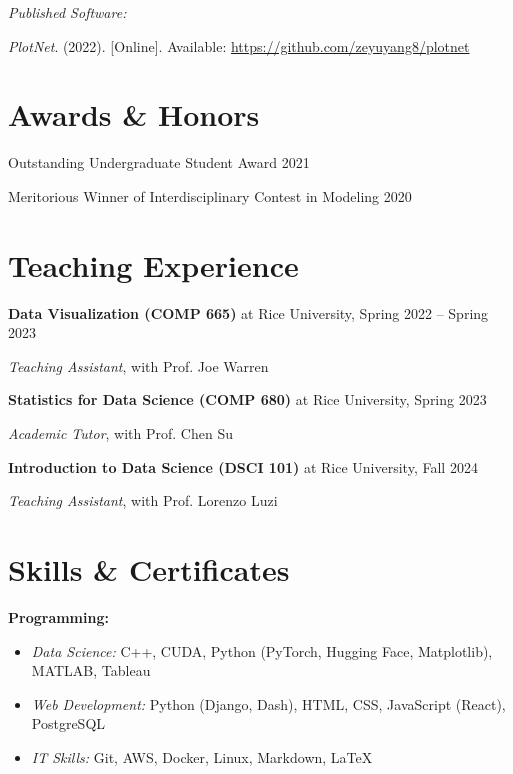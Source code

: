 \documentclass[11pt]{article}
\begin{document}
\vspace{\lineskip}

\textit{Published Software:}

\begin{enumerate}[resume, label={[\arabic*]}]
    \item \label{joe-plotnet} \textit{PlotNet}. (2022). [Online]. Available: \url{https://github.com/zeyuyang8/plotnet}
\end{enumerate}

\section*{Awards \& Honors}

Outstanding Undergraduate Student Award \hfill 2021

Meritorious Winner of Interdisciplinary Contest in Modeling \hfill 2020

\section*{Teaching Experience}

\textbf{Data Visualization (COMP 665)} at Rice University, \hfill Spring 2022 -- Spring 2023

\textit{Teaching Assistant}, with Prof. Joe Warren

\vspace{\lineskip}

\textbf{Statistics for Data Science (COMP 680)} at Rice University, \hfill Spring 2023

\textit{Academic Tutor}, with Prof. Chen Su

\vspace{\lineskip}

\textbf{Introduction to Data Science (DSCI 101)} at Rice University, \hfill Fall 2024

\textit{Teaching Assistant}, with Prof. Lorenzo Luzi

\section*{Skills \& Certificates}
\textbf{Programming:}

\begin{itemize}
    \item {\textit{Data Science:}} C++, CUDA, Python (PyTorch, Hugging Face, Matplotlib), MATLAB, Tableau
    \item {\textit{Web Development:}} Python (Django, Dash), HTML, CSS, JavaScript (React), PostgreSQL
    \item {\textit{IT Skills:}} Git, AWS, Docker, Linux, Markdown, LaTeX
\end{itemize}
\end{document}
